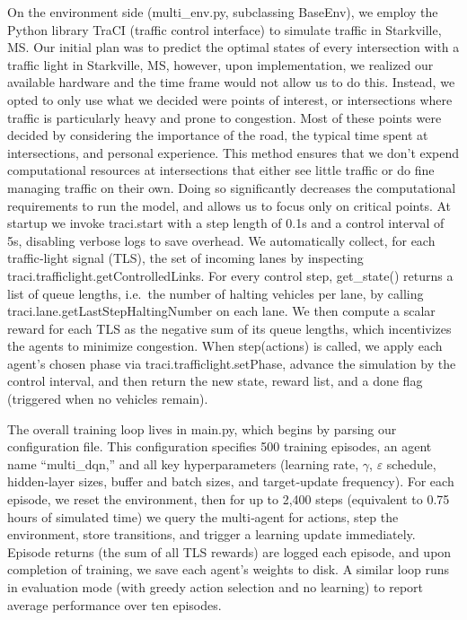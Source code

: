 \documentclass[conference]{IEEEtran}
\begin{document}
On the environment side (multi\_env.py, subclassing BaseEnv), we employ the Python library TraCI (traffic control interface) to simulate traffic in Starkville, MS. Our initial plan was to predict the optimal states of every intersection with a traffic light in Starkville, MS, however, upon implementation, we realized our available hardware and the time frame would not allow us to do this. Instead, we opted to only use what we decided were points of interest, or intersections where traffic is particularly heavy and prone to congestion. Most of these points were decided by considering the importance of the road, the typical time spent at intersections, and personal experience. This method ensures that we don't expend computational resources at intersections that either see little traffic or do fine managing traffic on their own. Doing so significantly decreases the computational requirements to run the model, and allows us to focus only on critical points. At startup we invoke traci.start with a step length of 0.1s and a control interval of 5s, disabling verbose logs to save overhead. We automatically collect, for each traffic‐light signal (TLS), the set of incoming lanes by inspecting traci.trafficlight.getControlledLinks. For every control step, get\_state() returns a list of queue lengths, i.e.\ the number of halting vehicles per lane, by calling traci.lane.getLastStepHaltingNumber on each lane. We then compute a scalar reward for each TLS as the negative sum of its queue lengths, which incentivizes the agents to minimize congestion. When step(actions) is called, we apply each agent’s chosen phase via traci.trafficlight.setPhase, advance the simulation by the control interval, and then return the new state, reward list, and a done flag (triggered when no vehicles remain).

The overall training loop lives in main.py, which begins by parsing our configuration file. This configuration specifies 500 training episodes, an agent name ``multi\_dqn,'' and all key hyperparameters (learning rate, $\gamma$, $\varepsilon$ schedule, hidden‐layer sizes, buffer and batch sizes, and target‐update frequency). For each episode, we reset the environment, then for up to 2,400 steps (equivalent to 0.75 hours of simulated time) we query the multi‐agent for actions, step the environment, store transitions, and trigger a learning update immediately. Episode returns (the sum of all TLS rewards) are logged each episode, and upon completion of training, we save each agent’s weights to disk. A similar loop runs in evaluation mode (with greedy action selection and no learning) to report average performance over ten episodes.
\end{document}
